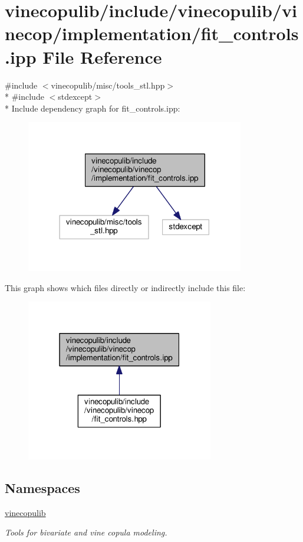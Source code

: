 \hypertarget{vinecop_2implementation_2fit__controls_8ipp}{}\section{vinecopulib/include/vinecopulib/vinecop/implementation/fit\+\_\+controls.ipp File Reference}
\label{vinecop_2implementation_2fit__controls_8ipp}
{\ttfamily \#include $<$vinecopulib/misc/tools\+\_\+stl.\+hpp$>$}\\*
{\ttfamily \#include $<$stdexcept$>$}\\*
Include dependency graph for fit\+\_\+controls.\+ipp\+:\nopagebreak
\begin{figure}[H]
\begin{center}
\leavevmode
\includegraphics[width=270pt]{vinecop_2implementation_2fit__controls_8ipp__incl}
\end{center}
\end{figure}
This graph shows which files directly or indirectly include this file\+:\nopagebreak
\begin{figure}[H]
\begin{center}
\leavevmode
\includegraphics[width=232pt]{vinecop_2implementation_2fit__controls_8ipp__dep__incl}
\end{center}
\end{figure}
\subsection*{Namespaces}
\begin{DoxyCompactItemize}
\item 
 \hyperlink{namespacevinecopulib}{vinecopulib}
\begin{DoxyCompactList}\small\item\em Tools for bivariate and vine copula modeling. \end{DoxyCompactList}\end{DoxyCompactItemize}

